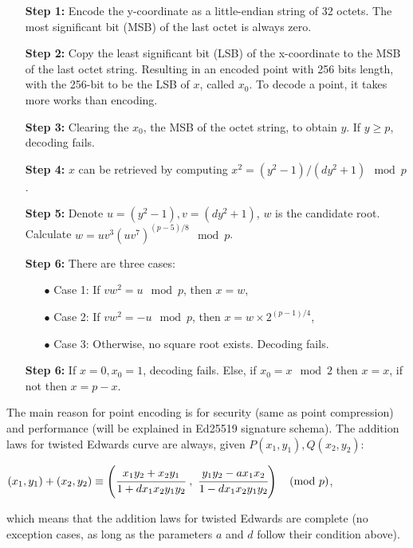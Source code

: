 \begin{itemize}[leftmargin=2.2cm]
  \item[\textbf{Step 1:}] Encode the y-coordinate as a little-endian string of 32 octets. The most significant bit (MSB) of the last octet is always zero.
  \item[\textbf{Step 2:}] Copy the least significant bit (LSB) of the x-coordinate to the MSB of the last octet string. Resulting in an encoded point with 256 bits length, with the 256-bit to be the LSB of $x$, called $x_0$. To decode a point, it takes more works than encoding.
  \item[\textbf{Step 3:}] Clearing the $x_0$, the MSB of the octet string, to obtain $y$. If $y \geq p$, decoding fails.
  \item[\textbf{Step 4:}] $x$ can be retrieved by computing $x^2 = (y^2 - 1)/(dy^2 + 1) \mod p$.
  \item[\textbf{Step 5:}] Denote $u = (y^2-1), v = (dy^2 + 1)$, $w$ is the candidate root. Calculate $w = uv^3(uv^7)^{(p-5)/8} \mod p$.
  \item[\textbf{Step 6:}] There are three cases:

        \begin{itemize}[leftmargin=0.5mm]
          \item[$\bullet$] Case 1: If $vw^2 = u \mod p$, then $x = w$,
          \item[$\bullet$] Case 2: If $vw^2 = -u \mod p$, then $x = w \times 2^{(p-1)/4}$,
          \item[$\bullet$] Case 3: Otherwise, no square root exists. Decoding fails.
        \end{itemize}

  \item[\textbf{Step 6:}] If $x = 0,x_0 = 1$, decoding fails. Else, if $x_0 = x \mod 2$ then $x = x$, if not then $x = p - x$.
\end{itemize}

The main reason for point encoding is for security (same as point compression) and performance (will be explained in Ed25519 signature schema). The addition laws for twisted Edwards curve are always, given $P(x_1, y_1), Q(x_2, y_2)$:

\begin{center}
  $(x_1, y_1) + (x_2, y_2) \equiv \left(\cfrac{x_1y_2 + x_2y_1}{1 + dx_1x_2y_1y_2} \ , \ \cfrac{y_1y_2 - ax_1x_2}{1 - dx_1x_2y_1y_2}\right) \quad (\text{mod} \ p)$,
\end{center}

which means that the addition laws for twisted Edwards are complete (no exception cases, as long as the parameters $a$ and $d$ follow their condition above).

